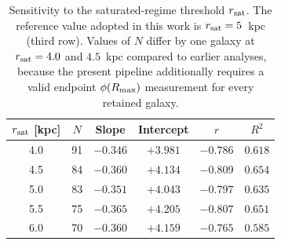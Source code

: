 \begin{table}[htbp]
\centering
\caption{Sensitivity to the saturated-regime threshold $r_{\rm sat}$.
         The reference value adopted in this work is $r_{\rm sat}=5$~kpc (third row).
         Values of $N$ differ by one galaxy at $r_{\rm sat}=4.0$ and $4.5$~kpc
         compared to earlier analyses, because the present pipeline additionally
         requires a valid endpoint $\phi(R_{\rm max})$ measurement for every
         retained galaxy.}
\label{tab:r_sat}
\begin{tabular}{cccccc}
\hline
$r_{\rm sat}$ [kpc] & $N$ & Slope & Intercept & $r$ & $R^2$ \\
\hline
4.0 & 91 & $-0.346$ & $+3.981$ & $-0.786$ & $0.618$ \\
4.5 & 84 & $-0.360$ & $+4.134$ & $-0.809$ & $0.654$ \\
5.0 & 83 & $-0.351$ & $+4.043$ & $-0.797$ & $0.635$ \\
5.5 & 75 & $-0.365$ & $+4.205$ & $-0.807$ & $0.651$ \\
6.0 & 70 & $-0.360$ & $+4.159$ & $-0.765$ & $0.585$ \\
\hline
\end{tabular}
\end{table}

